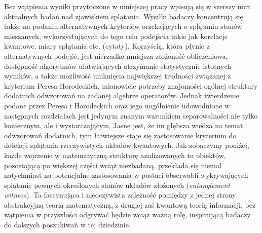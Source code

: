 Bez wątpienia wyniki przytoczone w niniejszej pracy wpisują się w szerszy nurt
aktualnych badań nad zjawiskiem splątania.
Wysiłki badaczy koncentrują się także na podaniu alternatywnych kryteriów
orzekających o splątaniu stanów mieszanych,
wykorzystujących do tego celu podejścia takie jak korelacje kwantowe,
miary splątania etc. (cytaty).
Korzyścią, która płynie z alternatywnych podejść,
jest nierzadko mniejsza złożoność obliczeniowa,
dostępność algorytmów ułatwiających otrzymanie statystycznie istotnych wyników,
a także możliwość uniknięcia największej trudności związanej z kryterium
Peresa-Horodeckich,
mianowicie potrzeby znajomości ogólnej struktury dodatnich odwzorowań
na zadanej algebrze operatorów.
Jednak twierdzenie podane przez Peresa i Horodeckich oraz 
jego uogólnienie udowodnione w następnych rozdziałach
jest jedynym znanym warunkiem separowalności nie tylko koniecznym, ale i wystarczającym.
Jasne jest,
że im głębsza wiedza na temat odwzorowań dodatnich,
tym łatwiejsze staje się zastosowanie kryterium do detekcji splątania
rzeczywistych układów kwantowych.
Jak zobaczymy poniżej,
każde wejrzenie w matematyczną strukturę analizowanych tu obiektów,
pozostającą po większej części wciąż niezbadaną,
przekłada się niemal natychmiast na potencjalne zastosowania w postaci
obserwabli wykrywających splątanie pewnych określonych stanów układów złożonych
(\emph{entanglement witness}).
Ta fascynująca i nieoczywista zależność pomiędzy z jednej strony abstrakcyjną
teorią matematyczną,
z drugiej zaś kwantową teorią informacji,
bez wątpienia w przyszłości odgrywać będzie wciąż ważną rolę,
inspirującą badaczy do dalszych poszukiwań w tej dziedzinie.



























